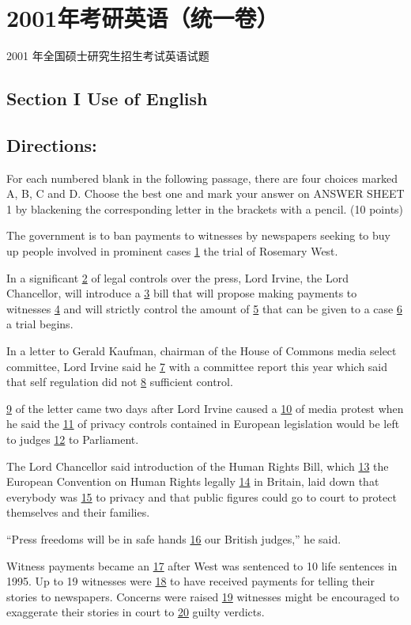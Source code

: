 \documentclass[UTF8,11pt]{ctexart}
\begin{document}
\section*{2001年考研英语（统一卷）}
2001 年全国硕士研究生招生考试英语试题


\subsection*{\textbf{Section I Use of English}}


\subsection*{\textbf{Directions:}}


For each numbered blank in the following passage, there are four choices marked A, B, C and D. Choose the best one and mark your answer on ANSWER SHEET 1 by blackening the corresponding letter in the brackets with a pencil. (10 points)


The government is to ban payments to witnesses by newspapers seeking to buy up people involved in prominent cases \uline{1} the trial of Rosemary West.


In a significant \uline{2} of legal controls over the press, Lord Irvine, the Lord Chancellor, will introduce a \uline{3} bill that will propose making payments to witnesses \uline{4} and will strictly control the amount of \uline{5} that can be given to a case \uline{6} a trial begins.


In a letter to Gerald Kaufman, chairman of the House of Commons media select committee, Lord Irvine said he \uline{7} with a committee report this year which said that self regulation did not \uline{8} sufficient control.


\uline{9} of the letter came two days after Lord Irvine caused a \uline{10} of media protest when he said the \uline{11} of privacy controls contained in European legislation would be left to judges \uline{12} to Parliament.


The Lord Chancellor said introduction of the Human Rights Bill, which \uline{13} the European Convention on Human Rights legally \uline{14} in Britain, laid down that everybody was \uline{15} to privacy and that public figures could go to court to protect themselves and their families.


“Press freedoms will be in safe hands \uline{16} our British judges,” he said.


Witness payments became an \uline{17} after West was sentenced to 10 life sentences in 1995. Up to 19 witnesses were \uline{18} to have received payments for telling their stories to newspapers. Concerns were raised \uline{19} witnesses might be encouraged to exaggerate their stories in court to \uline{20} guilty verdicts.
\end{document}
